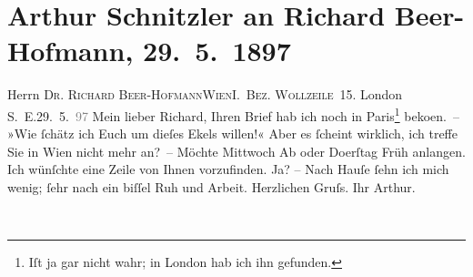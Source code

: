 

         
         \renewcommand{\erwaehntePersonen}{Personen: Richard Beer-Hofmann}
         \renewcommand{\erwaehnteOrte}{Orte: Forest Hill, I., Innere Stadt, London, Paris, Wien, Wollzeile, Österreich}
         \renewcommand{\erwaehnteWerke}{}
               \section[Arthur Schnitzler an Richard Beer-Hofmann, 29. 5. 1897]{ Arthur Schnitzler an Richard Beer-Hofmann, 29. 5. 1897}\nopagebreak{}\rehead{ }\begin{ledgroupsized}[t]{13cm}\normalsize\beginnumbering \toendnotes[C]{\smallbreak\pagebreak[2]} 
\pstart{}{\pb}Herrn \textsc{Dr. Richard
                     Beer-Hofmann}\pend{}\pstart{}\textsc{Wien}\pend{}\pstart{}\textsc{I. Bez. Wollzeile 15}.\pend{}{\bigskip}\pstart
           \raggedleft{}{\pb}London S. E.29. 5. \textcolor{gray}{97}\pend
           \pstart
           Mein lieber Richard, Ihren Brief hab ich noch in Paris\footnote{\noindent{}Iſt ja gar nicht wahr; in London hab ich ihn
                     gefunden.} beko{\geminationm}en. – »Wie ſchätz ich Euch um dieſes
               Ekels willen!«\pend
           \pstart
           Aber es ſcheint wirklich, ich treffe Sie in Wien
               nicht mehr an? – Möchte Mittwoch{ }\introOben{}Ab\introOben{} oder Do{\geminationn}erſtag{ }Früh anlangen. Ich wünſchte eine Zeile von Ihnen vorzufinden. Ja? – Nach
               Hauſe ſehn ich mich wenig; ſehr nach ein biſſel Ruh und Arbeit.\pend
           \pstart Herzlichen Gruſs. Ihr \spacefill\mbox{Arthur.}\pend{}
         
         \endnumbering{}\end{ledgroupsized}  \newcommand{\dateiname}{L00681}\newcommand{\titel}{Arthur Schnitzler an Richard Beer-Hofmann, 29. 5. 1897}\newcommand{\editorInnen}{Martin Anton Müller und Gerd-Hermann Susen}
      